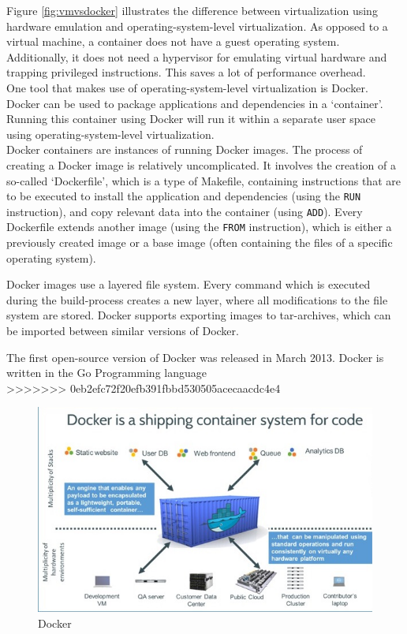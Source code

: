 Figure \ref{fig:vmvsdocker} illustrates the difference between virtualization using hardware emulation and operating-system-level virtualization. As opposed to a virtual machine, a container does not have a guest operating system. Additionally, it does not need a hypervisor for emulating virtual hardware and trapping privileged instructions. This saves a lot of performance overhead. \\

One tool that makes use of operating-system-level virtualization is Docker. Docker can be used to package applications and dependencies in a `container'. Running this container using Docker will run it within a separate user space using operating-system-level virtualization. \\
Docker containers are instances of running Docker images. The process of creating a Docker image is relatively uncomplicated. It involves the creation of a so-called `Dockerfile', which is a type of Makefile, containing instructions that are to be executed to install the application and dependencies (using the \verb|RUN| instruction), and copy relevant data into the container (using \verb|ADD|). Every Dockerfile extends another image (using the \verb|FROM| instruction), which is either a previously created image or a base image (often containing the files of a specific operating system).

Docker images use a layered file system. Every command which is executed during the
build-process creates a new layer, where all modifications to the file system are stored.
Docker supports exporting images to tar-archives, which can be imported between similar versions of Docker.

The first open-source version of Docker was released in March 2013. Docker is written in the Go Programming language \\


>>>>>>> 0eb2efc72f20efb391fbbd530505acecaacdc4e4

\begin{figure}[H]
\centering
\includegraphics[scale=0.8]{images/docker_container.jpeg}
\caption{Docker}
\label{fig:analysis-mvc}
\end{figure}

